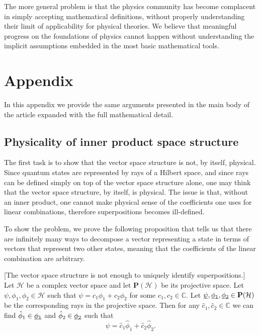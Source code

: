 \documentclass[10pt,twocolumn, nofootinbib]{revtex4-2}
\begin{document}
The more general problem is that the physics community has become complacent in simply accepting mathematical definitions, without properly understanding their limit of applicability for physical theories. We believe that meaningful progress on the foundations of physics cannot happen without understanding the implicit assumptions embedded in the most basic mathematical tools.



\newcommand{\pj}[1] {\underbar{$#1$}}

\section*{Appendix}

In this appendix we provide the same arguments presented in the main body of the article expanded with the full mathematical detail.

\subsection{Physicality of inner product space structure}

The first task is to show that the vector space structure is not, by itself, physical. Since quantum states are represented by rays of a Hilbert space, and since rays can be defined simply on top of the vector space structure alone, one may think that the vector space structure, by itself, is physical. The issue is that, without an inner product, one cannot make physical sense of the coefficients one uses for linear combinations, therefore superpositions becomes ill-defined.

To show the problem, we prove the following proposition that tells us that there are infinitely many ways to decompose a vector representing a state in terms of vectors that represent two other states, meaning that the coefficients of the linear combination are arbitrary.
\begin{prop}\label{vector_insufficient}[The vector space structure is not enough to uniquely identify superpositions.] Let $\mathcal{H}$ be a complex vector space and let $\textbf{P}(\mathcal{H})$ be its projective space. Let $\psi, \phi_1, \phi_2 \in \mathcal{H}$ such that $\psi = c_1 \phi_1 + c_2 \phi_2$ for some $c_1, c_2 \in \mathbb{C}$. Let $\pj{\psi}, \pj{\phi_1}, \pj{\phi_2} \in \textbf{P}(\mathcal{H})$ be the corresponding rays in the projective space. Then for any $\hat{c}_1, \hat{c}_2 \in \mathbb{C}$ we can find $\hat{\phi}_1 \in \pj{\phi_1}$ and $\hat{\phi}_2 \in \pj{\phi_2}$ such that
$$\psi = \hat{c}_1 \hat{\phi}_1 + \hat{c}_2 \hat{\phi}_2.$$
\end{prop}
\end{document}
